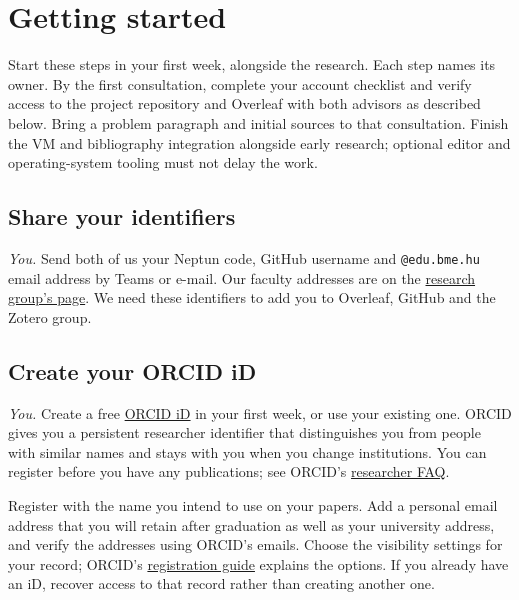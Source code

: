 \chapter{Getting started}\label{guide:start}
Start these steps in your first week, alongside the research. Each step names its owner. By the first consultation, complete your account checklist and verify access to the project repository and Overleaf with both advisors as described below. Bring a problem paragraph and initial sources to that consultation. Finish the VM and bibliography integration alongside early research; optional editor and operating-system tooling must not delay the work.

\section{Share your identifiers}\label{guide:start:ids}
\emph{You.} Send both of us your Neptun code, GitHub username and \texttt{@edu.bme.hu} email address by Teams or e-mail. Our faculty addresses are on the \href{https://ftsrg.mit.bme.hu/en/about/}{research group's page}. We need these identifiers to add you to Overleaf, GitHub and the Zotero group.

\section{Create your ORCID iD}\label{guide:start:orcid}
\emph{You.} Create a free \href{https://orcid.org/register}{ORCID iD} in your first week, or use your existing one. ORCID gives you a persistent researcher identifier that distinguishes you from people with similar names and stays with you when you change institutions. You can register before you have any publications; see ORCID's \href{https://info.orcid.org/researcher-faq/}{researcher FAQ}.

Register with the name you intend to use on your papers. Add a personal email address that you will retain after graduation as well as your university address, and verify the addresses using ORCID's emails. Choose the visibility settings for your record; ORCID's \href{https://support.orcid.org/hc/en-us/articles/360006897454-How-do-I-register-for-an-ORCID-ID}{registration guide} explains the options. If you already have an iD, recover access to that record rather than creating another one.

